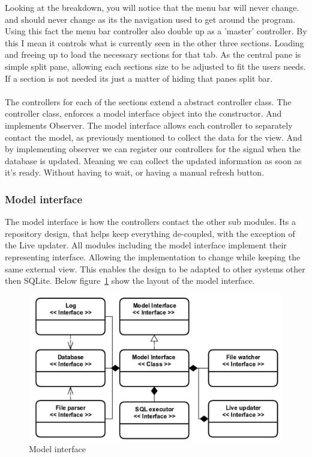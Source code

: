 Looking at the breakdown, you will notice that the menu bar will never change. and should never change as its the navigation used to get around the program. Using this fact the menu bar controller also double up as a 'master' controller. By this I mean it controls what is currently seen in the other three sections. Loading and freeing up to load the necessary sections for that tab. As the central pane is simple split pane, allowing each sections size to be adjusted to fit the users needs. If a section is not needed its just a matter of hiding that panes split bar. 
\\\\
The controllers for each of the sections extend a abstract controller class. The controller class, enforces a model interface object into the constructor. And implements Observer. The model interface allows each controller to separately contact the model, as previously mentioned to collect the data for the view. And by implementing observer we can register our controllers for the signal when the database is updated. Meaning we can collect the updated information as soon as it's ready. Without having to wait, or having a manual refresh button.    

\subsubsection{Model interface}
\label{subsubsec:imp_model_interface}

The model interface is how the controllers contact the other sub modules. Its a repository design, that helps keep everything de-coupled, with the exception of the Live updater. All modules including the model interface implement their representing interface. Allowing the implementation to change while keeping the same external view. This enables the design to be adapted to other systems other then SQLite. Below figure~\ref{fig:model_interface_design} show the layout of the model interface.

\begin{figure}[H]
	\centering
	\includegraphics[scale=0.3]{images/model_interface_design.png}
	\caption{Model interface}
	\label{fig:model_interface_design}
\end{figure}

